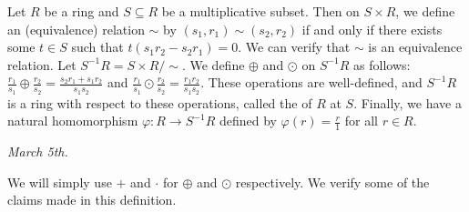 \begin{definition}
    Let $R$ be a ring and $S \subseteq R$ be a multiplicative subset. Then on $S \times R$, we define an (equivalence) relation $\sim$ by $(s_{1},r_{1}) \sim (s_{2},r_{2})$ if and only if there exists some $t \in S$ such that $t(s_{1}r_{2} - s_{2}r_{1}) = 0$. We can verify that $\sim$ is an equivalence relation. Let $S^{-1}R = S \times R/\sim$. We define $\oplus$ and $\odot$ on $S^{-1}R$ as follows: $\frac{r_{1}}{s_{1}} \oplus \frac{r_{2}}{s_{2}} = \frac{s_{2}r_{1} + s_{1}r_{2}}{s_{1}s_{2}}$ and $\frac{r_{1}}{s_{1}} \odot \frac{r_{2}}{s_{2}} = \frac{r_{1}r_{2}}{s_{1}s_{2}}$. These operations are well-defined, and $S^{-1}R$ is a ring with respect to these operations, called the  of $R$ at $S$. Finally, we have a natural homomorphism $\varphi:R \to S^{-1}R$ defined by $\varphi(r) = \frac{r}{1}$ for all $r \in R$. 
\end{definition}

\noindent \textit{March 5th.}

We will simply use $+$ and $\cdot$ for $\oplus$ and $\odot$ respectively. We verify some of the claims made in this definition.

